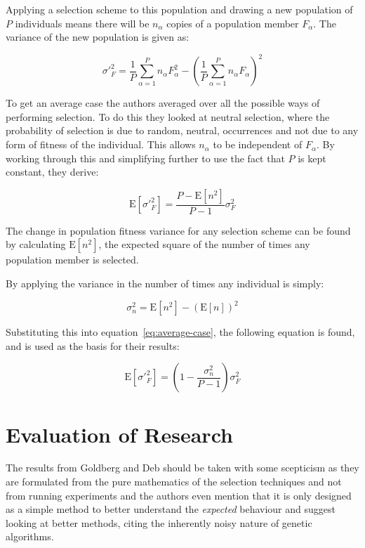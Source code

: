\documentclass[10pt, a4paper]{article}
\begin{document}
Applying a selection scheme to this population and drawing a new population of
$P$ individuals means there will be $n_\alpha$ copies of a population member
$F_\alpha$. The variance of the new population is given as:

\begin{equation}
\sigma'^2_F = \frac{1}{P} \sum^{P}_{\alpha=1}{n_\alpha F^2_\alpha} - \left(
\frac{1}{P} \sum^P_{\alpha=1}{n_\alpha F_\alpha}\right)^2
\end{equation}

To get an average case the authors averaged over all the possible ways of
performing selection. To do this they looked at neutral selection, where the
probability of selection is due to random, neutral, occurrences and not due to
any form of fitness of the individual. This allows $n_\alpha$ to be independent
of $F_\alpha$. By working through this and simplifying further to use the fact
that $P$ is kept constant, they derive:

\begin{equation}
\text{E}[\sigma'^2_F] = \frac{P - \text{E}[n^2]}{P-1}\sigma^2_F
\label{eq:average-case}
\end{equation}

The change in population fitness variance for any selection scheme can be found
by calculating $\text{E}[n^2]$, the expected square of the number of times any
population member is selected.

By applying the variance in the number of times any individual is simply:

\begin{equation}
\sigma^2_n = \text{E}[n^2] - (\text{E}[n])^2
\end{equation}

Substituting this into equation~\ref{eq:average-case}, the following equation
is found, and is used as the basis for their results:

\begin{equation}
\text{E}[\sigma'^2_F] = \left( 1 - \frac{\sigma^2_n}{P-1}\right) \sigma^2_F
\end{equation}

\newpage
\section{Evaluation of Research}

The results from Goldberg and Deb\cite{Goldberg1991Comparative} should be taken
with some scepticism as they are formulated from the pure mathematics of the 
selection techniques and not from running experiments and the authors even 
mention that it is only designed as a simple method to better understand the 
\textit{expected} behaviour and suggest looking at better methods, citing the 
inherently noisy nature of genetic algorithms.
\end{document}
